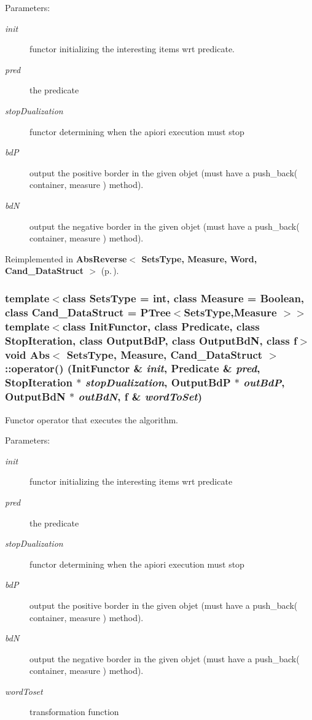 \begin{Desc}
\item[Parameters:]
\begin{description}
\item[{\em init}]functor initializing the interesting items wrt predicate. \item[{\em pred}]the predicate \item[{\em stop\-Dualization}]functor determining when the apiori execution must stop \item[{\em bd\-P}]output the positive border in the given objet (must have a push\_\-back( container, measure ) method). \item[{\em bd\-N}]output the negative border in the given objet (must have a push\_\-back( container, measure ) method). \end{description}
\end{Desc}


Reimplemented in {\bf Abs\-Reverse$<$ Sets\-Type, Measure, Word, Cand\_\-Data\-Struct $>$} {\rm (p.\,\pageref{class_abs_reverse_783d932854ce93bd14518406996d8090})}.
\subsubsection{\setlength{\rightskip}{0pt plus 5cm}template$<$class Sets\-Type = int, class Measure = Boolean, class Cand\_\-Data\-Struct = PTree$<$Sets\-Type,Measure $>$$>$ template$<$class Init\-Functor, class Predicate, class Stop\-Iteration, class Output\-Bd\-P, class Output\-Bd\-N, class f$>$ void {\bf Abs}$<$ Sets\-Type, Measure, Cand\_\-Data\-Struct $>$::operator() (Init\-Functor \& {\em init}, {\bf Predicate} \& {\em pred}, Stop\-Iteration $\ast$ {\em stop\-Dualization}, Output\-Bd\-P $\ast$ {\em out\-Bd\-P}, Output\-Bd\-N $\ast$ {\em out\-Bd\-N}, f \& {\em word\-To\-Set})\hspace{0.3cm}{\tt  [inline]}}\label{class_abs_991fe73b7db6f50b75e434631187ec9a}


Functor operator that executes the algorithm. 

\begin{Desc}
\item[Parameters:]
\begin{description}
\item[{\em init}]functor initializing the interesting items wrt predicate \item[{\em pred}]the predicate \item[{\em stop\-Dualization}]functor determining when the apiori execution must stop \item[{\em bd\-P}]output the positive border in the given objet (must have a push\_\-back( container, measure ) method). \item[{\em bd\-N}]output the negative border in the given objet (must have a push\_\-back( container, measure ) method). \item[{\em word\-Toset}]transformation function \end{description}
\end{Desc}


